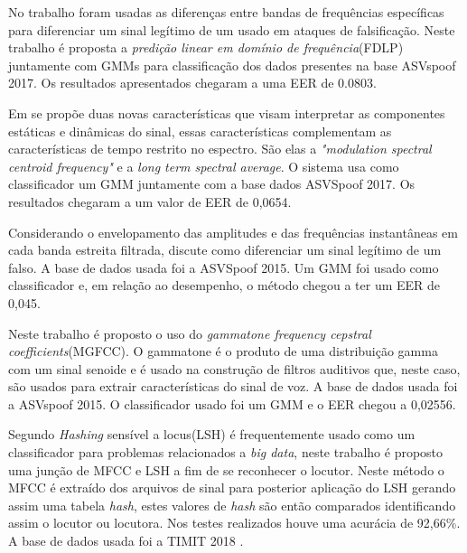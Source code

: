 \documentclass[a4paper,12pt,openright,oneside]{book}
\newenvironment{myenv}[1]
  {\begin{spacing}{#1}}
  {\end{spacing}}
\begin{document}
\begin{myenv}{1.5}
			\par No trabalho \cite{ISI:000465363900139} foram usadas as diferenças entre bandas de frequências específicas para diferenciar um sinal legítimo de um usado em ataques de falsificação. Neste trabalho é proposta a \textit{predição linear em domínio de frequência}(FDLP) juntamente com GMMs para classificação dos dados presentes na base ASVspoof  2017. Os resultados apresentados chegaram a uma EER de 0.0803.
			
			\par Em \cite{Suthokumar2018} se propõe duas novas características que visam interpretar as componentes estáticas e dinâmicas do sinal, essas características complementam as características de tempo restrito no espectro. São elas a \textit{"modulation  spectral  centroid  frequency"} e a \textit{long term spectral average}. O sistema usa como classificador um GMM juntamente com a base dados ASVSpoof 2017. Os resultados chegaram a um valor de EER de 0,0654.
			
			\par Considerando o envelopamento das amplitudes e das frequências instantâneas em cada banda estreita filtrada,  \cite{ISI:000458728700054} discute como diferenciar um sinal legítimo de um falso. A base de dados usada foi a  ASVSpoof 2015. Um GMM foi usado como classificador e, em relação ao desempenho, o método chegou a ter um EER de 0,045.

			\par Neste trabalho \cite{ISI:000392503100008} é proposto o uso do \textit{gammatone frequency cepstral coefficients}(MGFCC). O gammatone é o produto de uma distribuição gamma com um sinal senoide e é usado na construção de filtros auditivos que, neste caso, são usados para extrair características do sinal de voz. A base de dados usada foi a ASVspoof 2015. O classificador usado foi um GMM e o EER chegou a 0,02556.
			
			\par Segundo \cite{8396208} \textit{Hashing} sensível a locus(LSH) é frequentemente usado como um classificador para problemas relacionados a \textit{big data}, neste trabalho é proposto uma junção de MFCC e LSH a fim de se reconhecer o locutor. Neste método o MFCC é extraído dos arquivos de sinal para posterior aplicação do LSH gerando assim uma tabela \textit{hash}, estes valores de \textit{hash} são então comparados identificando assim o locutor ou locutora. Nos testes realizados houve uma acurácia de 92,66\%. A base de dados usada foi a TIMIT 2018 \cite{TIMIT2018}. 


\end{myenv}
\end{document}
